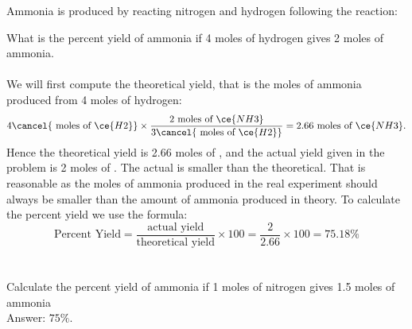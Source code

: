 \documentclass[main.tex]{subfiles}
\begin{document}
\begin{description}
\begin{example} %
Ammonia is produced by reacting nitrogen and hydrogen following the reaction:
\begin{center} \end{center}
What is the percent yield of ammonia if 4 moles of hydrogen gives 2 moles of ammonia.  \\
\\
We will first compute the theoretical yield, that is the moles of ammonia produced from 4 moles of hydrogen:
\begin{equation*}
4\cancel{\text{ moles of }\ce{H2}} \times \dfrac{\text{2 moles of }\ce{NH3}}{3\cancel{\text{ moles of }\ce{H2}}}=2.66\text{ moles of }\ce{NH3}.
\end{equation*}
Hence the theoretical yield is 2.66 moles of , and the actual yield given in the problem is 2 moles of . The actual is smaller than the theoretical. That is reasonable as the moles of ammonia produced in the real experiment should always be smaller than the amount of ammonia produced in theory. To calculate the percent yield we use the formula:
\begin{equation*}
 \text{Percent Yield}=\dfrac{\text{actual yield}}{\text{theoretical yield}}\times 100=\frac{2}{2.66}\times 100=75.18\%
\end{equation*}
\\
\faDiamond\ \\
Calculate the percent yield of ammonia if 1 moles of nitrogen gives 1.5 moles of ammonia \\
\flushright Answer: $75\%$.
\end{example}%



\end{description}
\end{document}
